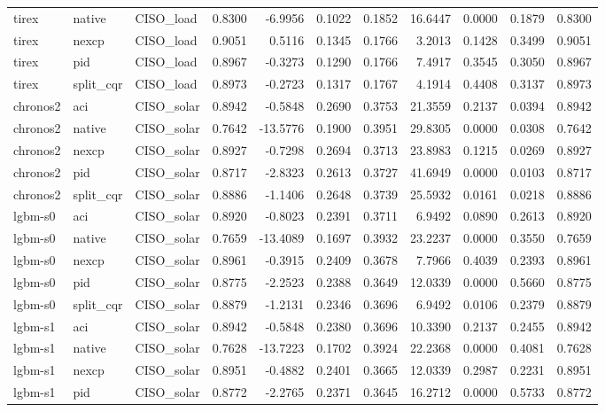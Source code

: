 \begin{tabular}{lllrrrrrrrr}
tirex & native & CISO_load & 0.8300 & -6.9956 & 0.1022 & 0.1852 & 16.6447 & 0.0000 & 0.1879 & 0.8300 \\
tirex & nexcp & CISO_load & 0.9051 & 0.5116 & 0.1345 & 0.1766 & 3.2013 & 0.1428 & 0.3499 & 0.9051 \\
tirex & pid & CISO_load & 0.8967 & -0.3273 & 0.1290 & 0.1766 & 7.4917 & 0.3545 & 0.3050 & 0.8967 \\
tirex & split_cqr & CISO_load & 0.8973 & -0.2723 & 0.1317 & 0.1767 & 4.1914 & 0.4408 & 0.3137 & 0.8973 \\
chronos2 & aci & CISO_solar & 0.8942 & -0.5848 & 0.2690 & 0.3753 & 21.3559 & 0.2137 & 0.0394 & 0.8942 \\
chronos2 & native & CISO_solar & 0.7642 & -13.5776 & 0.1900 & 0.3951 & 29.8305 & 0.0000 & 0.0308 & 0.7642 \\
chronos2 & nexcp & CISO_solar & 0.8927 & -0.7298 & 0.2694 & 0.3713 & 23.8983 & 0.1215 & 0.0269 & 0.8927 \\
chronos2 & pid & CISO_solar & 0.8717 & -2.8323 & 0.2613 & 0.3727 & 41.6949 & 0.0000 & 0.0103 & 0.8717 \\
chronos2 & split_cqr & CISO_solar & 0.8886 & -1.1406 & 0.2648 & 0.3739 & 25.5932 & 0.0161 & 0.0218 & 0.8886 \\
lgbm-s0 & aci & CISO_solar & 0.8920 & -0.8023 & 0.2391 & 0.3711 & 6.9492 & 0.0890 & 0.2613 & 0.8920 \\
lgbm-s0 & native & CISO_solar & 0.7659 & -13.4089 & 0.1697 & 0.3932 & 23.2237 & 0.0000 & 0.3550 & 0.7659 \\
lgbm-s0 & nexcp & CISO_solar & 0.8961 & -0.3915 & 0.2409 & 0.3678 & 7.7966 & 0.4039 & 0.2393 & 0.8961 \\
lgbm-s0 & pid & CISO_solar & 0.8775 & -2.2523 & 0.2388 & 0.3649 & 12.0339 & 0.0000 & 0.5660 & 0.8775 \\
lgbm-s0 & split_cqr & CISO_solar & 0.8879 & -1.2131 & 0.2346 & 0.3696 & 6.9492 & 0.0106 & 0.2379 & 0.8879 \\
lgbm-s1 & aci & CISO_solar & 0.8942 & -0.5848 & 0.2380 & 0.3696 & 10.3390 & 0.2137 & 0.2455 & 0.8942 \\
lgbm-s1 & native & CISO_solar & 0.7628 & -13.7223 & 0.1702 & 0.3924 & 22.2368 & 0.0000 & 0.4081 & 0.7628 \\
lgbm-s1 & nexcp & CISO_solar & 0.8951 & -0.4882 & 0.2401 & 0.3665 & 12.0339 & 0.2987 & 0.2231 & 0.8951 \\
lgbm-s1 & pid & CISO_solar & 0.8772 & -2.2765 & 0.2371 & 0.3645 & 16.2712 & 0.0000 & 0.5733 & 0.8772 \\

\end{tabular}
